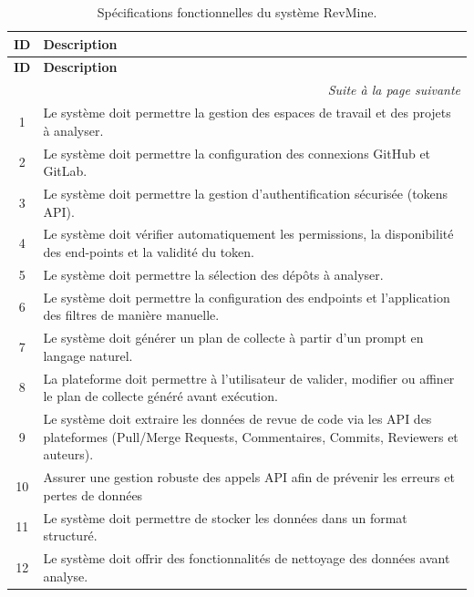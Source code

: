 \begin{center}
\begin{longtable}{|c|p{15cm}|}
    \caption{Spécifications fonctionnelles du système RevMine.}
    \label{tab:functional-specs} \\
    \hline
    \textbf{ID} & \textbf{Description} \\
    \hline
    \endfirsthead

    \hline
    \textbf{ID} & \textbf{Description} \\
    \hline
    \endhead

    \hline
    \multicolumn{2}{|r|}{\textit{Suite à la page suivante}} \\
    \hline
    \endfoot

    \hline
    \endlastfoot

    1 & Le système doit permettre la gestion des espaces de travail et des projets à analyser. \\\hline
    2 & Le système doit permettre la configuration des connexions GitHub et GitLab. \\\hline
    3 & Le système doit permettre la gestion d'authentification sécurisée (tokens API). \\\hline
    4 & Le système doit vérifier automatiquement les permissions, la disponibilité des end-points et la validité du token. \\\hline
    5 & Le système doit permettre la sélection des dépôts à analyser. \\\hline
    6 & Le système doit permettre la configuration des endpoints et l'application des filtres de manière manuelle. \\\hline
    7 & Le système doit générer un plan de collecte à partir d'un prompt en langage naturel. \\\hline
    8 & La plateforme doit permettre à l'utilisateur de valider, modifier ou affiner le plan de collecte généré avant exécution. \\\hline
    9 & Le système doit extraire les données de revue de code via les API des plateformes (Pull/Merge Requests, Commentaires, Commits, Reviewers et auteurs). \\\hline
    10 & Assurer une gestion robuste des appels API afin de prévenir les erreurs et pertes de données \\\hline
    11 & Le système doit permettre de stocker les données dans un format structuré. \\\hline
    12 & Le système doit offrir des fonctionnalités de nettoyage des données avant analyse. \\\hline

\end{longtable}
\end{center}
